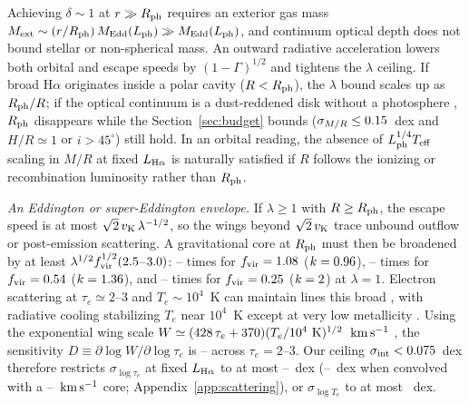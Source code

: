 \documentclass[twocolumn,linenumbers]{aastex701}
\newcommand{\Ha}{H$\alpha$}
\newcommand{\kms}{\ensuremath{{\rm km\,s^{-1}}}}
\newcommand{\sigint}{\sigma_{\rm int}}
\newcommand{\LHa}{L_{\rm H\alpha}}
\newcommand{\Lph}{L_{\rm ph}}
\newcommand{\Rph}{R_{\rm ph}}
\newcommand{\Teff}{T_{\rm eff}}
\newcommand{\vK}{v_{\rm K}}
\begin{document}
Achieving $\delta\sim1$ at $r\gg\Rph$ requires an exterior gas mass $M_{\rm ext}\sim(r/\Rph)\,M_{\rm Edd}(\Lph)\gg M_{\rm Edd}(\Lph)$, and continuum optical depth does not bound stellar or non-spherical mass.
An outward radiative acceleration lowers both orbital and escape speeds by $(1-\Gamma)^{1/2}$ and tightens the $\lambda$ ceiling.
If broad \Ha{} originates inside a polar cavity ($R<\Rph$), the $\lambda$ bound scales up as $\Rph/R$; if the optical continuum is a dust-reddened disk without a photosphere \citep{Madau2026a}, $\Rph$ disappears while the Section~\ref{sec:budget} bounds ($\sigma_{M/R}\leq0.15{}$~dex and $H/R\simeq1$ or $i>45^\circ$) still hold.
In an orbital reading, the absence of $\Lph^{1/4}\Teff$ scaling in $M/R$ at fixed $\LHa$ is naturally satisfied if $R$ follows the ionizing or recombination luminosity rather than $\Rph$.

\emph{An Eddington or super-Eddington envelope.}
If $\lambda\geq1$ with $R\geq\Rph$, the escape speed is at most $\sqrt{2}\,\vK\,\lambda^{-1/2}$, so the wings beyond $\sqrt{2}\,\vK$ trace unbound outflow or post-emission scattering.
A gravitational core at $\Rph$ must then be broadened by at least $\lambda^{1/2}f_{\rm vir}^{1/2}(2.5{}$--$3.0{})$: \brdVirLo{}--\brdVirHi{} times for $f_{\rm vir}=1.08$ ($k=0.96{}$), \brdIsoLo{}--\brdIsoHi{} times for $f_{\rm vir}=0.54$ ($k=1.36{}$), and \brdRingLo{}--\brdRingHi{} times for $f_{\rm vir}=0.25$ ($k=2{}$) at $\lambda=1$.
Electron scattering at $\tau_e\simeq2$--3 and $T_e\sim10^{4}$~K can maintain lines this broad \citep{Inayoshi2026}, with radiative cooling stabilizing $T_e$ near $10^{4}$~K except at very low metallicity \citep{Sneppen2026}.
Using the exponential wing scale $W\simeq(428{}\,\tau_e+370{})(T_e/10^{4}~{\rm K})^{1/2}$~\kms{} \citep{Rusakov2026}, the sensitivity $D\equiv\partial\log W/\partial\log\tau_e$ is \DTwo{}--\DThree{} across $\tau_e=2$--3.
Our ceiling $\sigint<\FsigUp{}$~dex therefore restricts $\sigma_{\log\tau_e}$ at fixed $\LHa$ to at most \sigTauThree{}--\sigTauTwo{}~dex (\sigTauConvHiLo{}--\sigTauConvHiHi{}~dex when convolved with a \coreLo{}--\coreHi{}~\kms{} core; Appendix~\ref{app:scattering}), or $\sigma_{\log T_e}$ to at most \sigTeMax{}~dex.
\end{document}
